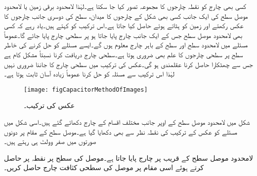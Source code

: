 کسی بھی چارج کو نقطہ چارجوں کا مجموعہ تصور کیا جا سکتا ہے۔لہٰذا لامحدود برقی زمین یا لامحدود موصل سطح  کی ایک جانب کسی بھی شکل کے چارجوں  کا میدان، سطح کی دوسری جانب چارجوں کا عکس رکھتے اور زمین کو ہٹاتے ہوئے حاصل کیا جاتا ہے۔اس ترکیب کو  کہتے ہیں۔یاد رہے کہ کسی بھی لامحدود موصل سطح جس کے ایک جانب چارج پایا جاتا ہو پر سطحی چارج پایا جائے گا۔عموماً مسئلے میں لامحدود سطح اور سطح کے باہر چارج معلوم ہوں گے۔ایسے مسئلے کو حل کرنے کی خاطر سطح پر سطحی چارجوں کا علم بھی ضروری ہوتا ہے۔سطحی چارج دریافت کرنا نسبتاً مشکل کام ہے جس سے چھٹکارا حاصل کرنا عقلمندی ہو گی۔عکس کی ترکیب میں سطحی چارج کا جاننا ضروری نہیں لہٰذا اس ترکیب سے مسئلہ کو حل کرنا عموماً زیادہ آسان ثابت ہوتا ہے۔
\begin{figure}
\centering
\texttt{[image: figCapacitorMethodOfImages]}
\caption{عکس کی ترکیب۔}
\label{شکل_کپیسٹر_عکس_کی_ترکیب}
\end{figure}

شکل   میں لامحدود موصل سطح کے اوپر جانب مختلف اقسام کے چارج دکھائے گئے ہیں۔اسی شکل میں مسئلے کو عکس کے ترکیب کی نقطہ نظر سے بھی دکھایا گیا ہے۔موصل سطح کے مقام پر دونوں صورتوں میں صفر وولٹ ہی رہتے ہیں۔ 

 لامحدود موصل سطح  کے قریب  پر  چارج پایا جاتا ہے۔موصل کی سطح پر نقطہ  پر  حاصل کرتے ہوئے اسی مقام پر موصل کی سطحی کثافت چارج حاصل کریں۔

